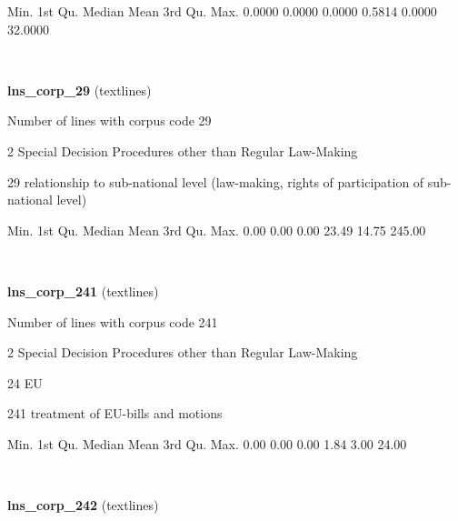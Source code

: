 \documentclass[]{article}
\newenvironment{Shaded}{\begin{snugshade}}{\end{snugshade}}
\newcommand{\FloatTok}[1]{\textcolor[rgb]{0.00,0.00,0.81}{{#1}}}
\newcommand{\NormalTok}[1]{{#1}}
\begin{document}
\begin{Shaded}
\begin{Highlighting}[]
   \NormalTok{Min. 1st Qu.  Median    Mean 3rd Qu.    Max. }
 \FloatTok{0.0000}  \FloatTok{0.0000}  \FloatTok{0.0000}  \FloatTok{0.5814}  \FloatTok{0.0000} \FloatTok{32.0000} 
\end{Highlighting}
\end{Shaded}

~

\vspace{1em}

\textbf{lns\_corp\_29} (textlines)

Number of lines with corpus code 29

2 Special Decision Procedures other than Regular Law-Making

29 relationship to sub-national level (law-making, rights of
participation of sub-national level)

\begin{Shaded}
\begin{Highlighting}[]
   \NormalTok{Min. 1st Qu.  Median    Mean 3rd Qu.    Max. }
   \FloatTok{0.00}    \FloatTok{0.00}    \FloatTok{0.00}   \FloatTok{23.49}   \FloatTok{14.75}  \FloatTok{245.00} 
\end{Highlighting}
\end{Shaded}

~

\vspace{1em}

\textbf{lns\_corp\_241} (textlines)

Number of lines with corpus code 241

2 Special Decision Procedures other than Regular Law-Making

24 EU

241 treatment of EU-bills and motions

\begin{Shaded}
\begin{Highlighting}[]
   \NormalTok{Min. 1st Qu.  Median    Mean 3rd Qu.    Max. }
   \FloatTok{0.00}    \FloatTok{0.00}    \FloatTok{0.00}    \FloatTok{1.84}    \FloatTok{3.00}   \FloatTok{24.00} 
\end{Highlighting}
\end{Shaded}

~

\vspace{1em}

\textbf{lns\_corp\_242} (textlines)
\end{document}
